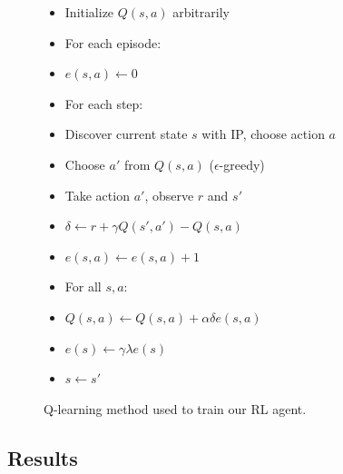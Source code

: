 \documentclass{article}
\begin{document}
\begin{figure}
    \centering
    \caption{Q-learning method used to train our RL agent.}
    \begin{itemize}
    \item[] Initialize $Q(s, a)$ arbitrarily
    \item[] For each episode:
    \item[] \hspace{2em} $e(s, a) \leftarrow 0$
    \item[] \hspace{2em} For each step:
    \item[] \hspace{4em} Discover current state $s$ with IP, choose action $a$
    \item[] \hspace{4em} Choose $a'$ from $Q(s, a)$ ($\epsilon$-greedy)
    \item[] \hspace{4em} Take action $a'$, observe $r$ and $s'$
    \item[] \hspace{4em} $\delta \leftarrow r + \gamma Q(s', a') - Q(s, a)$
    \item[] \hspace{4em} $e(s, a) \leftarrow e(s, a) + 1$
    \item[] \hspace{4em} For all $s, a$:
    \item[] \hspace{6em} $Q(s, a) \leftarrow Q(s, a) + \alpha \delta e(s, a)$
    \item[] \hspace{6em} $e(s) \leftarrow \gamma \lambda e(s)$
    \item[] \hspace{4em} $s \leftarrow s'$
  \end{itemize}
  \label{qlearn:code}
\end{figure}

\subsection{Results}
\end{document}

